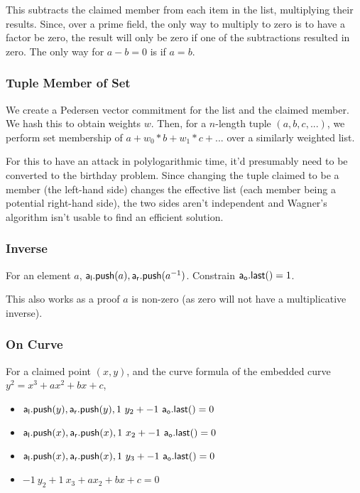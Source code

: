 \documentclass[]{article}
\begin{document}
This subtracts the claimed member from each item in the list, multiplying their results. Since, over a prime field, the only way to multiply to zero is to have a factor be zero, the result will only be zero if one of the subtractions resulted in zero. The only way for $a - b = 0$ is if $a = b$.

\subsubsection{Tuple Member of Set}

We create a Pedersen vector commitment for the list and the claimed member. We hash this to obtain weights $w$. Then, for a $n$-length tuple $(a, b, c, ...)$, we perform set membership of $a + w_0 * b + w_1 * c + ...$ over a similarly weighted list.

For this to have an attack in polylogarithmic time, it'd presumably need to be converted to the birthday problem. Since changing the tuple claimed to be a member (the left-hand side) changes the effective list (each member being a potential right-hand side), the two sides aren't independent and Wagner's algorithm isn't usable to find an efficient solution.

\subsubsection{Inverse}

For an element $a$, $\mathsf{a_l.push}(a), \mathsf{a_r.push}(a^{-1})$. Constrain $\mathsf{a_o.last()} = 1$.

This also works as a proof $a$ is non-zero (as zero will not have a multiplicative inverse).

\subsubsection{On Curve}

For a claimed point $(x, y)$, and the curve formula of the embedded curve $y^2 = x^3 + a x^2 + b x + c$,

\begin{itemize}
	\item $\mathsf{a_l.push}(y), \mathsf{a_r.push}(y), 1 ~y_2 + -1 ~\mathsf{a_o.last()} = 0$
	\item $\mathsf{a_l.push}(x), \mathsf{a_r.push}(x), 1 ~x_2 + -1 ~\mathsf{a_o.last()} = 0$
	\item $\mathsf{a_l.push}(x), \mathsf{a_r.push}(x), 1 ~y_3 + -1 ~\mathsf{a_o.last()} = 0$
	\item $-1 ~y_2 + 1 ~x_3 + a x_2 + b x + c = 0$
\end{itemize}
\end{document}
